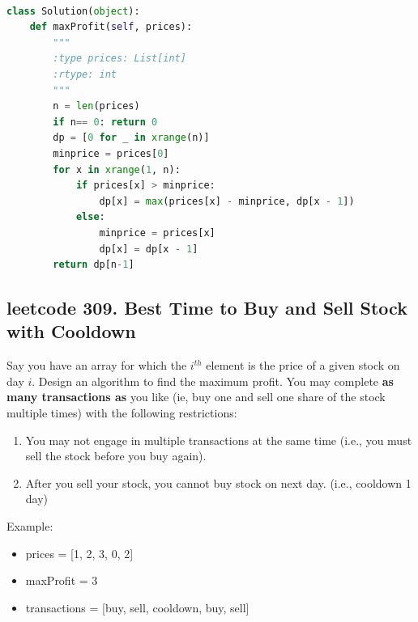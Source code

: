 \documentclass[a4paper,10pt]{article}
\begin{document}
\begin{lstlisting}[language=Python, caption=Problem121. Best Time to Buy and Sell Stock]

class Solution(object):
    def maxProfit(self, prices):
        """
        :type prices: List[int]
        :rtype: int
        """
        n = len(prices)
        if n== 0: return 0
        dp = [0 for _ in xrange(n)]
        minprice = prices[0]
        for x in xrange(1, n):
            if prices[x] > minprice:
                dp[x] = max(prices[x] - minprice, dp[x - 1])
            else:
                minprice = prices[x]
                dp[x] = dp[x - 1]
        return dp[n-1]
\end{lstlisting}





\subsection{leetcode 309. Best Time to Buy and Sell Stock with Cooldown}
Say you have an array for which the $i^{th}$ element is the price of a given stock on day $i$. Design an algorithm to find the maximum profit. You may complete \textbf{as many transactions as} you like (ie, buy one and sell one share of the stock multiple times) with the following restrictions:
\begin{enumerate}
    \item You may not engage in multiple transactions at the same time (i.e., you must sell the stock before you buy again).
    \item After you sell your stock, you cannot buy stock on next day. (i.e., cooldown 1 day)
\end{enumerate}

\noindent Example:
\begin{itemize}
    \item prices = [1, 2, 3, 0, 2]
    \item maxProfit = 3
    \item transactions = [buy, sell, cooldown, buy, sell] \\
\end{itemize}
\end{document}
